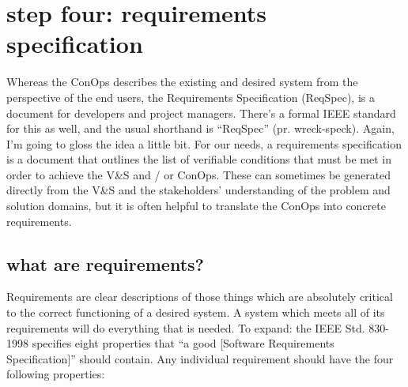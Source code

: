 \documentclass[12pt,oneside]{book}
\begin{document}
\newpage
{}
\section*{step four: requirements specification}
\label{scrivauto:20}

Whereas the ConOps describes the existing and desired system from the perspective of the end users, the Requirements Specification (ReqSpec), is a document for developers and project managers. There's a formal IEEE standard for this as well, and the usual shorthand is ``ReqSpec'' (pr. wreck-speck). Again, I'm going to gloss the idea a little bit. For our needs, a requirements specification is a document that outlines the list of verifiable conditions that must be met in order to achieve the V\&S and / or ConOps. These can sometimes be generated directly from the V\&S and the stakeholders' understanding of the problem and solution domains, but it is often helpful to translate the ConOps into concrete requirements.

\subsection*{what are requirements?}
\label{scrivauto:21}

Requirements are clear descriptions of those things which are absolutely critical to the correct functioning of a desired system. A system which meets all of its requirements will do everything that is needed. To expand: the IEEE Std. 830-1998 specifies eight properties that ``a good [Software Requirements Specification]'' should contain. Any individual requirement should have the four following properties:
\end{document}
